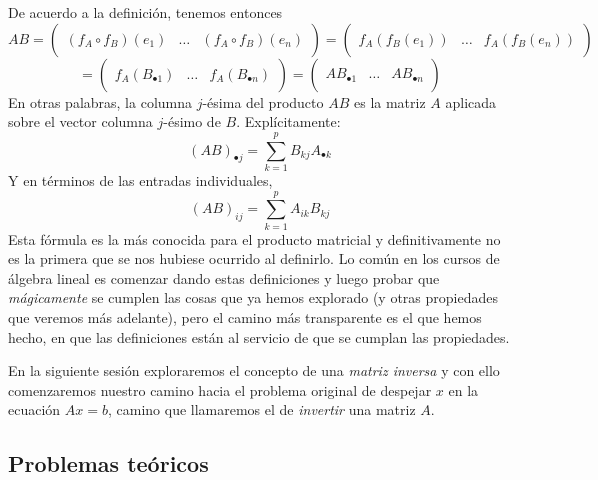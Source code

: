 De acuerdo a la definición, tenemos entonces
\[AB = \begin{pmatrix} & & \\ (f_A \circ f_B)(e_1) & \dots & (f_A \circ f_B)(e_n) \\ & & \end{pmatrix} = \begin{pmatrix} & & \\ f_A(f_B(e_1)) & \dots & f_A(f_B(e_n)) \\ & & \end{pmatrix}\]
\[= \begin{pmatrix} & & \\ f_A(B_{\bullet 1}) & \dots & f_A(B_{\bullet n}) \\ & & \end{pmatrix} = \begin{pmatrix} & & \\ AB_{\bullet 1} & \dots & A B_{\bullet n} \\ & & \end{pmatrix}\]
En otras palabras, la columna $j$-ésima del producto $AB$ es la matriz $A$ aplicada sobre el vector columna $j$-ésimo de $B$. Explícitamente:
\[(AB)_{\bullet j} = \sum_{k = 1}^{p} B_{kj} A_{\bullet k}\]
Y en términos de las entradas individuales,
\[(AB)_{ij} = \sum_{k=1}^p A_{ik} B_{kj}\]
Esta fórmula es la más conocida para el producto matricial y definitivamente no es la primera que se nos hubiese ocurrido al definirlo. Lo común en los cursos de álgebra lineal es comenzar dando estas definiciones y luego probar que \textit{mágicamente} se cumplen las cosas que ya hemos explorado (y otras propiedades que veremos más adelante), pero el camino más transparente es el que hemos hecho, en que las definiciones están al servicio de que se cumplan las propiedades.

En la siguiente sesión exploraremos el concepto de una \textit{matriz inversa} y con ello comenzaremos nuestro camino hacia el problema original de despejar $x$ en la ecuación $Ax = b$, camino que llamaremos el de \textit{invertir} una matriz $A$.

\subsection{Problemas teóricos}

